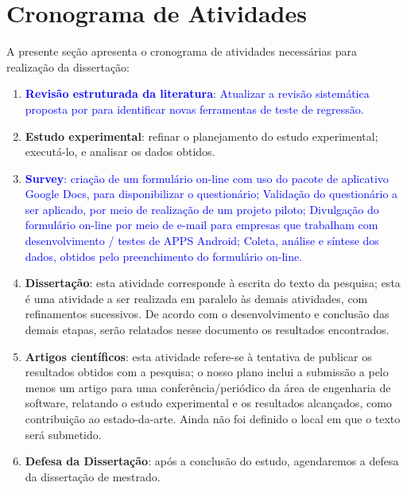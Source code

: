 \section{Cronograma de Atividades}

A presente seção apresenta o cronograma de atividades necessárias para realização da dissertação:

\begin{enumerate}[label=\bf AT\arabic*,leftmargin=1.7cm]

    \item \textcolor{blue}{\textbf{Revisão estruturada da literatura}: Atualizar a revisão sistemática proposta por  para identificar novas ferramentas de teste de regressão.}
    
    \item \textbf{Estudo experimental}: refinar o planejamento do estudo experimental; executá-lo, e analisar os dados obtidos.
    
    \item \textcolor{blue}{\textbf{Survey}: criação de um formulário on-line com uso do pacote de aplicativo Google Docs, para disponibilizar o questionário; Validação do questionário a ser aplicado, por meio de realização de um projeto piloto; Divulgação do formulário on-line por meio de e-mail para empresas que trabalham com desenvolvimento / testes de \ac{APPS} Android;     Coleta, análise e síntese dos dados, obtidos pelo preenchimento do formulário on-line.}
    
    \item \textbf{Dissertação}: esta atividade corresponde à escrita do texto da pesquisa; esta é uma atividade a ser realizada em paralelo às demais atividades, com refinamentos sucessivos. De acordo com o desenvolvimento e conclusão das demais etapas, serão relatados nesse documento os resultados encontrados.
    
    \item \textbf{Artigos científicos}: esta atividade refere-se à tentativa de publicar os resultados obtidos com a pesquisa; o nosso plano inclui a submissão a pelo menos um artigo para uma conferência/periódico da área de engenharia de software, relatando o estudo experimental e os resultados alcançados, como contribuição ao estado-da-arte. Ainda não foi definido o local em que o texto será submetido.
    
    \item \textbf{Defesa da Dissertação}: após a conclusão do estudo, agendaremos a defesa da dissertação de mestrado. 

\end{enumerate}

